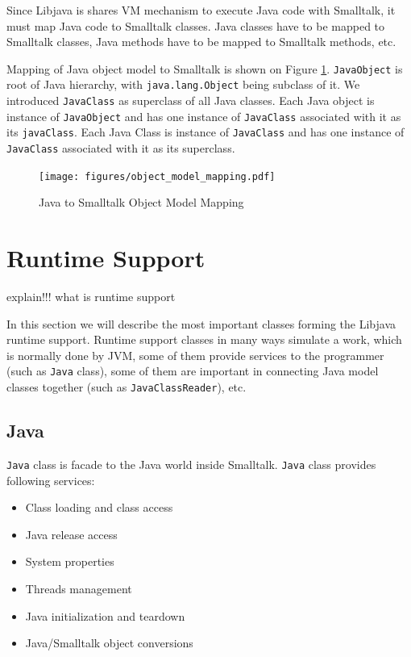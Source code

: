 \documentclass[11pt,twoside,a4paper]{book}
\newcommand{\jv}[1]{{\color{red} #1}}
\newcommand{\libjava}{{Libjava}}
\begin{document}
Since \libjava{} is shares VM mechanism to execute Java code with Smalltalk, it must map Java code to Smalltalk classes.
Java classes have to be mapped to Smalltalk classes, Java methods have to be mapped to Smalltalk methods, etc.

Mapping of Java object model to Smalltalk is shown on Figure \ref{fig:obj_model_mapping}. 
\texttt{JavaObject} is root of Java hierarchy, with \texttt{java.lang.Object} being subclass of it. 
We introduced \texttt{JavaClass} as superclass of all Java classes. 
Each Java object is instance of \texttt{JavaObject} and has one instance of \texttt{JavaClass} associated with it as its \texttt{javaClass}. 
Each Java Class is instance of \texttt{JavaClass} and has one instance of \texttt{JavaClass} associated with it as its superclass.

\begin{figure}[ht]
	\begin{center}
		\texttt{[image: figures/object\_model\_mapping.pdf]}
	\end{center}
	\caption{Java to Smalltalk Object Model Mapping}
	\label{fig:obj_model_mapping}
\end{figure}


\section{Runtime Support} 
\jv{explain!!! what is runtime support}

In this section we will describe the most important classes forming the \libjava{} runtime support. 
Runtime support classes in many ways simulate a work, which is normally done by JVM, some of them provide services to the programmer (such as \texttt{Java} class), some of them are important in connecting Java model classes together (such as \texttt{JavaClassReader}), etc.

\subsection{Java}

\texttt{Java} class is facade to the Java world inside Smalltalk. 
\texttt{Java} class provides following services:

\begin{itemize}
	\item Class loading and class access
	\item Java release access
	\item System properties
	\item Threads management
	\item Java initialization and teardown
	\item Java/Smalltalk object conversions
\end{itemize}
\end{document}
